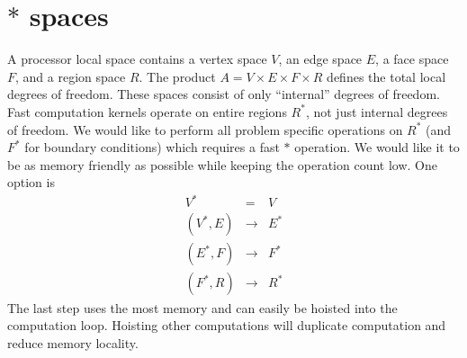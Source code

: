 \documentclass[a4paper]{article}
\begin{document}
\section{$*$ spaces}
A processor local space contains a vertex space $V$, an edge space $E$, a face
space $F$, and a region space $R$.  The product $A = V \times E \times F \times R$
defines the total local degrees of freedom.  These spaces consist of only
``internal'' degrees of freedom.  Fast computation kernels operate on entire
regions $R^*$, not just internal degrees of freedom.  We would like to perform all
problem specific operations on $R^*$ (and $F^*$ for boundary conditions) which
requires a fast $*$ operation.  We would like it to be as memory friendly as
possible while keeping the operation count low.  One option is
\begin{eqnarray*}  \label{eq:star}
  V^* &=& V \\
  (V^*,E) &\to& E^* \\
  (E^*,F) &\to& F^* \\
  (F^*,R) &\to& R^*
\end{eqnarray*}
The last step uses the most memory and can easily be hoisted into the
computation loop.  Hoisting other computations will duplicate computation and
reduce memory locality.
\end{document}
